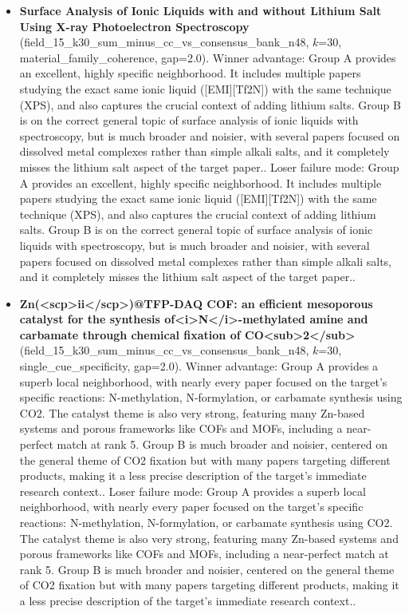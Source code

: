 \begin{itemize}
\item \textbf{Surface Analysis of Ionic Liquids with and without Lithium Salt Using X-ray Photoelectron Spectroscopy} (field\_15\_k30\_sum\_minus\_cc\_vs\_consensus\_bank\_n48, $k$=30, material\_family\_coherence, gap=2.0). Winner advantage: Group A provides an excellent, highly specific neighborhood. It includes multiple papers studying the exact same ionic liquid ([EMI][Tf2N]) with the same technique (XPS), and also captures the crucial context of adding lithium salts. Group B is on the correct general topic of surface analysis of ionic liquids with spectroscopy, but is much broader and noisier, with several papers focused on dissolved metal complexes rather than simple alkali salts, and it completely misses the lithium salt aspect of the target paper.. Loser failure mode: Group A provides an excellent, highly specific neighborhood. It includes multiple papers studying the exact same ionic liquid ([EMI][Tf2N]) with the same technique (XPS), and also captures the crucial context of adding lithium salts. Group B is on the correct general topic of surface analysis of ionic liquids with spectroscopy, but is much broader and noisier, with several papers focused on dissolved metal complexes rather than simple alkali salts, and it completely misses the lithium salt aspect of the target paper..
\item \textbf{Zn(<scp>ii</scp>)@TFP-DAQ COF: an efficient mesoporous catalyst for the synthesis of<i>N</i>-methylated amine and carbamate through chemical fixation of CO<sub>2</sub>} (field\_15\_k30\_sum\_minus\_cc\_vs\_consensus\_bank\_n48, $k$=30, single\_cue\_specificity, gap=2.0). Winner advantage: Group A provides a superb local neighborhood, with nearly every paper focused on the target's specific reactions: N-methylation, N-formylation, or carbamate synthesis using CO2. The catalyst theme is also very strong, featuring many Zn-based systems and porous frameworks like COFs and MOFs, including a near-perfect match at rank 5. Group B is much broader and noisier, centered on the general theme of CO2 fixation but with many papers targeting different products, making it a less precise description of the target's immediate research context.. Loser failure mode: Group A provides a superb local neighborhood, with nearly every paper focused on the target's specific reactions: N-methylation, N-formylation, or carbamate synthesis using CO2. The catalyst theme is also very strong, featuring many Zn-based systems and porous frameworks like COFs and MOFs, including a near-perfect match at rank 5. Group B is much broader and noisier, centered on the general theme of CO2 fixation but with many papers targeting different products, making it a less precise description of the target's immediate research context..
\end{itemize}
